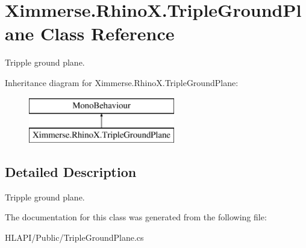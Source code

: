 \hypertarget{class_ximmerse_1_1_rhino_x_1_1_triple_ground_plane}{}\section{Ximmerse.\+Rhino\+X.\+Triple\+Ground\+Plane Class Reference}
\label{class_ximmerse_1_1_rhino_x_1_1_triple_ground_plane}


Tripple ground plane.  


Inheritance diagram for Ximmerse.\+Rhino\+X.\+Triple\+Ground\+Plane\+:\begin{figure}[H]
\begin{center}
\leavevmode
\includegraphics[height=2.000000cm]{class_ximmerse_1_1_rhino_x_1_1_triple_ground_plane}
\end{center}
\end{figure}


\subsection{Detailed Description}
Tripple ground plane. 



The documentation for this class was generated from the following file\+:\begin{DoxyCompactItemize}
\item 
H\+L\+A\+P\+I/\+Public/Triple\+Ground\+Plane.\+cs\end{DoxyCompactItemize}
